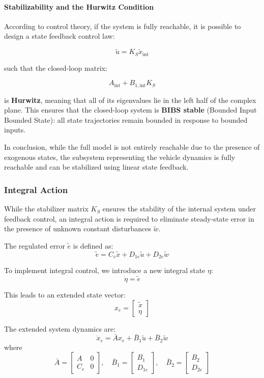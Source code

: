 \documentclass[]{report}
\begin{document}
\paragraph{Stabilizability and the Hurwitz Condition}

According to control theory, if the system is fully reachable, it is possible to design a state feedback control law:

\[
\tilde{u} = K_S \tilde{x}_{\text{int}}
\]

such that the closed-loop matrix:

\[
A_{\text{int}} + B_{1,\text{int}} K_S
\]

is \textbf{Hurwitz}, meaning that all of its eigenvalues lie in the left half of the complex plane. This ensures that the closed-loop system is \textbf{BIBS stable} (Bounded Input Bounded State): all state trajectories remain bounded in response to bounded inputs.

In conclusion, while the full model is not entirely reachable due to the presence of exogenous states, the subsystem representing the vehicle dynamics is fully reachable and can be stabilized using linear state feedback.


\subsubsection{Integral Action}

While the stabilizer matrix $K_S$ ensures the stability of the internal system under feedback control, an integral action is required to eliminate steady-state error in the presence of unknown constant disturbances $\tilde{w}$.

The regulated error $\tilde{e}$ is defined as:
\[
\tilde{e} = C_e \tilde{x} + D_{1e} \tilde{u} + D_{2e} \tilde{w}
\]

To implement integral control, we introduce a new integral state $\eta$:
\[
\dot{\eta} = \tilde{e}
\]

This leads to an extended state vector:
\[
x_e = \begin{bmatrix} \tilde{x} \\ \eta \end{bmatrix}
\]

The extended system dynamics are:
\[
\dot{x}_e = \bar{A} x_e + \bar{B}_1 \tilde{u} + \bar{B}_2 \tilde{w}
\]
where
\[
\bar{A} = \begin{bmatrix}
	A & 0 \\
	C_e & 0
\end{bmatrix},
\quad
\bar{B}_1 = \begin{bmatrix}
	B_1 \\
	D_{1e}
\end{bmatrix},
\quad
\bar{B}_2 = \begin{bmatrix}
	B_2 \\
	D_{2e}
\end{bmatrix}
\]
\end{document}
